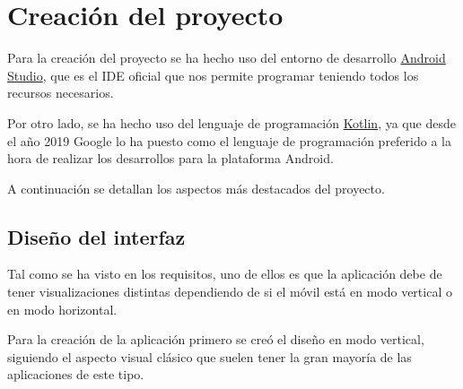 \documentclass{\ClassPath/viu-tfm-template}
\begin{document}
\chapter{Creación del proyecto}

Para la creación del proyecto se ha hecho uso del entorno de desarrollo \href{https://developer.android.com/studio/}{Android Studio}, que es el IDE oficial que nos permite programar teniendo todos los recursos necesarios.

Por otro lado, se ha hecho uso del lenguaje de programación \href{https://kotlinlang.org/}{Kotlin}, ya que desde el año 2019 Google lo ha puesto como el lenguaje de programación preferido a la hora de realizar los desarrollos para la plataforma Android.

A continuación se detallan los aspectos más destacados del proyecto.

\section{Diseño del interfaz}
Tal como se ha visto en los requisitos, uno de ellos es que la aplicación debe de tener visualizaciones distintas dependiendo de si el móvil está en modo vertical o en modo horizontal.

Para la creación de la aplicación primero se creó el diseño en modo vertical, siguiendo el aspecto visual clásico que suelen tener la gran mayoría de las aplicaciones de este tipo.
\end{document}
